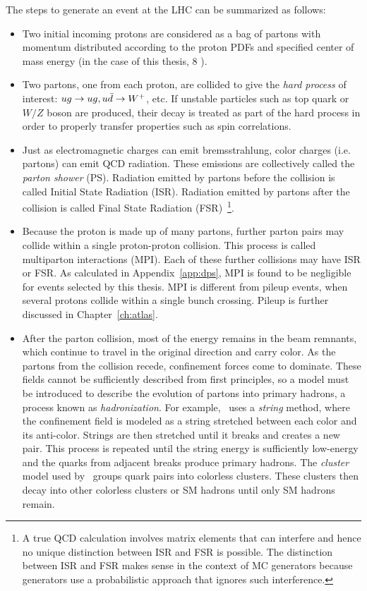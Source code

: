 The steps to generate an event at the LHC can be summarized as follows:
\begin{itemize}
\item Two initial incoming protons are considered as a bag of partons with momentum distributed according to the proton PDFs and specified center of mass energy (in the case of this thesis, 8 \tev).
\item Two partons, one from each proton, are collided to give the \emph{hard process} of interest: $ug \rightarrow ug, u\bar{d}\rightarrow W^{+}$, etc. If unstable particles such as top quark or $W/Z$ boson are produced, their decay is treated as part of the hard process in order to properly transfer properties such as spin correlations.
\item Just as electromagnetic charges can emit bremsstrahlung, color charges (i.e. partons) can emit QCD radiation. These emissions are collectively called the \emph{parton shower} (PS). Radiation emitted by partons before the collision is called Initial State Radiation (ISR). Radiation emitted by partons after the collision is called Final State Radiation (FSR)~\footnote{A true QCD calculation involves matrix elements that can interfere and hence no unique distinction between ISR and FSR is possible. The distinction between ISR and FSR makes sense in the context of MC generators because generators use a probabilistic approach that ignores such interference.}.  
\item Because the proton is made up of many partons, further parton pairs may collide within a single proton-proton collision. This process is called multiparton interactions (MPI). Each of these further collisions may have ISR or FSR. As calculated in Appendix~\ref{app:dps}, MPI is found to be negligible for events selected by this thesis. MPI is different from pileup events, when several protons collide within a single bunch crossing. Pileup is further discussed in Chapter~\ref{ch:atlas}.
\item After the parton collision, most of the energy remains in the beam remnants, which continue to travel in the original direction and carry color. As the partons from the collision recede, confinement forces come to dominate. These fields cannot be sufficiently described from first principles, so a model must be introduced to describe the evolution of partons into primary hadrons, a process known as \emph{hadronization}. For example, \py\ uses a \emph{string} method, where the confinement field is modeled as a string stretched between each color and its anti-color. Strings are then stretched until it breaks and creates a new pair. This process is repeated until the string energy is sufficiently low-energy and the quarks from adjacent breaks produce primary hadrons. The \emph{cluster} model used by \hw\ groups quark pairs into colorless clusters. These clusters then decay into other colorless clusters or SM hadrons until only SM hadrons remain.

\end{itemize}
